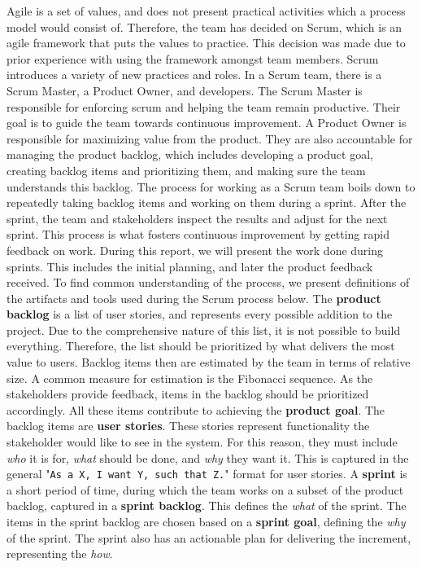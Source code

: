 Agile is a set of values, and does not present practical activities which a process model would consist of\cite{sutherlandScrumArtDoing2014}.
Therefore, the team has decided on Scrum\cite{scrumdotorg}, which is an agile framework that puts the values to practice.
This decision was made due to prior experience with using the framework amongst team members.
Scrum introduces a variety of new practices and roles.
In a Scrum team, there is a Scrum Master, a Product Owner, and developers.
The Scrum Master is responsible for enforcing scrum and helping the team remain productive.
Their goal is to guide the team towards continuous improvement.
A Product Owner is responsible for maximizing value from the product.
They are also accountable for managing the product backlog, which includes developing a product goal, creating backlog items and prioritizing them, and making sure the team understands this backlog.
The process for working as a Scrum team boils down to repeatedly taking backlog items and working on them during a sprint.
After the sprint, the team and stakeholders inspect the results and adjust for the next sprint.
This process is what fosters continuous improvement by getting rapid feedback on work.
During this report, we will present the work done during sprints.
This includes the initial planning, and later the product feedback received.
To find common understanding of the process, we present definitions of the artifacts and tools used during the Scrum process below.
The \textbf{product backlog} is a list of user stories, and represents every possible addition to the project. Due to the comprehensive nature of this list, it is not possible to build everything.
Therefore, the list should be prioritized by what delivers the most value to users.
Backlog items then are estimated by the team in terms of relative size. A common measure for estimation is the Fibonacci sequence.
As the stakeholders provide feedback, items in the backlog should be prioritized accordingly.
All these items contribute to achieving the \textbf{product goal}.
The backlog items are \textbf{user stories}. These stories represent functionality the stakeholder would like to see in the system.
For this reason, they must include \textit{who} it is for, \textit{what} should be done, and \textit{why} they want it. This is captured in the general "\texttt{As a X, I want Y, such that Z.}" format for user stories.
A \textbf{sprint} is a short period of time, during which the team works on a subset of the product backlog, captured in a \textbf{sprint backlog}.
This defines the \textit{what} of the sprint. The items in the sprint backlog are chosen based on a \textbf{sprint goal}, defining the \textit{why} of the sprint. The sprint also has an actionable plan for delivering the increment, representing the \textit{how}.
